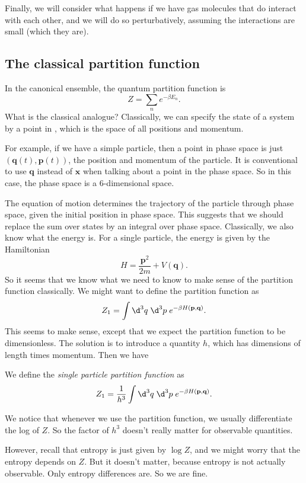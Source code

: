 \documentclass[a4paper]{article}
\begin{document}
Finally, we will consider what happens if we have gas molecules that do interact with each other, and we will do so perturbatively, assuming the interactions are small (which they are).

\subsection{The classical partition function}
In the canonical ensemble, the quantum partition function is
\[
  Z = \sum_n e^{-\beta E_n}.
\]
What is the classical analogue? Classically, we can specify the state of a system by a point in , which is the space of all positions and momentum.

For example, if we have a simple particle, then a point in phase space is just $(\mathbf{q}(t), \mathbf{p}(t))$, the position and momentum of the particle. It is conventional to use $\mathbf{q}$ instead of $\mathbf{x}$ when talking about a point in the phase space. So in this case, the phase space is a $6$-dimensional space.

The equation of motion determines the trajectory of the particle through phase space, given the initial position in phase space. This suggests that we should replace the sum over states by an integral over phase space. Classically, we also know what the energy is. For a single particle, the energy is given by the Hamiltonian
\[
  H = \frac{\mathbf{p}^2}{2m} + V(\mathbf{q}).
\]
So it seems that we know what we need to know to make sense of the partition function classically. We might want to define the partition function as
\[
  Z_1 = \int \d^3 q\; \d^3 p\; e^{-\beta H(\mathbf{p}, \mathbf{q})}.
\]
This seems to make sense, except that we expect the partition function to be dimensionless. The solution is to introduce a quantity $h$, which has dimensions of length times momentum. Then we have
\begin{defi}
  We define the \emph{single particle partition function} as
  \[
    Z_1 = \frac{1}{h^3} \int \d^3 q\; \d^3 p\; e^{-\beta H(\mathbf{p}, \mathbf{q})}.
  \]
\end{defi}
We notice that whenever we use the partition function, we usually differentiate the log of $Z$. So the factor of $h^3$ doesn't really matter for observable quantities.

However, recall that entropy is just given by $\log Z$, and we might worry that the entropy depends on $Z$. But it doesn't matter, because entropy is not actually observable. Only entropy differences are. So we are fine.
\end{document}
